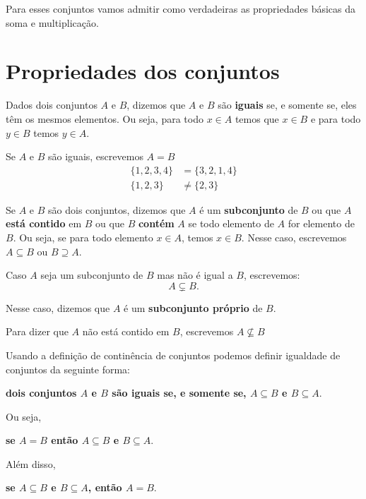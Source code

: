 \begin{observacao}
	Para esses conjuntos vamos admitir como verdadeiras as propriedades básicas da soma e multiplicação.
\end{observacao}
\section{Propriedades dos conjuntos}

\begin{definicao}
	Dados dois conjuntos $A$ e $B$, dizemos que $A$ e $B$ s{\~a}o \textbf{iguais} se, e somente se, eles t{\^e}m os mesmos elementos. Ou seja, para todo $x \in A$ temos que $x \in B$ e para todo $y \in B$ temos $y \in A$.
\end{definicao}

Se $A$ e $B$ s{\~a}o iguais, escrevemos $A = B$
\begin{align*}
	\{1,2,3,4\} &= \{3,2,1,4\}\\
	\{1,2,3\} &\ne \{2,3\} 
\end{align*}
	
\begin{definicao}
	Se $A$ e $B$ s{\~a}o dois conjuntos, dizemos que $A$ {\'e} um \textbf{subconjunto} de $B$ ou que $A$ \textbf{est\'a contido} em $B$ ou que $B$ \textbf{cont\'em} $A$ se todo elemento de $A$ for elemento de $B$. Ou seja, se para todo elemento $x \in A$, temos $x \in B$. Nesse caso, escrevemos $A \subseteq B$ ou $B \supseteq A$.
\end{definicao}


Caso $A$ seja um subconjunto de $B$ mas n{\~a}o {\'e} igual a $B$, escrevemos:
\[
A \subsetneq B.
\]

Nesse caso, dizemos que $A$ {\'e} um \textbf{subconjunto pr{\'o}prio} de $B$.

Para dizer que $A$ n{\~a}o est{\'a} contido em $B$, escrevemos $A \nsubseteq B$

Usando a defini\c{c}\~ao de contin\^encia de conjuntos podemos definir igualdade de conjuntos da seguinte forma:
\begin{center}
	\textbf{dois conjuntos $A$ e $B$ s\~ao iguais se, e somente se, $A \subseteq B$ e $B \subseteq A$}.
\end{center}

Ou seja,
\begin{center}
	\textbf{se $A = B$ ent{\~a}o $A \subseteq B$ e $B \subseteq A$}.
\end{center}

Além disso,
\begin{center}
	\textbf{se $A \subseteq B$ e $B \subseteq A$, ent{\~a}o $A = B$}.
\end{center}

